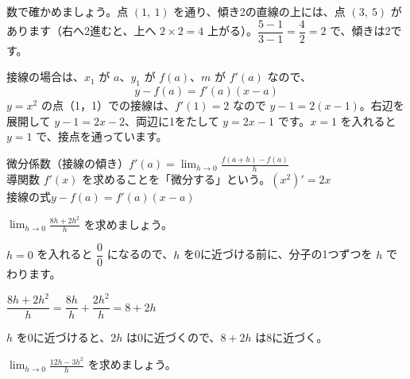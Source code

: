 \medskip
数で確かめましょう。点 $(1,\ 1)$ を通り、傾き2の直線の上には、点 $(3,\ 5)$ があります（右へ2進むと、上へ $2\times2=4$ 上がる）。$\dfrac{5-1}{3-1}=\dfrac{4}{2}=2$ で、傾きは2です。

接線の場合は、$x_1$ が $a$、$y_1$ が $f(a)$、$m$ が $f'(a)$ なので、
\[ y-f(a)=f'(a)(x-a) \]
$y=x^2$ の点（1，1）での接線は、$f'(1)=2$ なので $y-1=2(x-1)$。右辺を展開して $y-1=2x-2$、両辺に1をたして $y=2x-1$ です。$x=1$ を入れると $y=1$ で、接点を通っています。

\begin{taisetsu}
微分係数（接線の傾き）\quad $f'(a)=\displaystyle\lim_{h\to0}\frac{f(a+h)-f(a)}{h}$\\
導関数 $f'(x)$ を求めることを「微分する」という。$(x^2)'=2x$\\
接線の式\quad $y-f(a)=f'(a)(x-a)$
\end{taisetsu}

\begin{kotoba}
\small
{}
\end{kotoba}


\begin{reidai}[極限を求める]
$\displaystyle\lim_{h\to0}\frac{8h+2h^2}{h}$ を求めましょう。\par
\kangaekata $h=0$ を入れると $\dfrac{0}{0}$ になるので、$h$ を0に近づける前に、分子の1つずつを $h$ でわります。\par
\shiki $\dfrac{8h+2h^2}{h}=\dfrac{8h}{h}+\dfrac{2h^2}{h}=8+2h$\par
\hspace*{2.6\zw}$h$ を0に近づけると、$2h$ は0に近づくので、$8+2h$ は8に近づく。\par
{}
\end{reidai}

\begin{jibun}
$\displaystyle\lim_{h\to0}\frac{12h-3h^2}{h}$ を求めましょう。
\end{jibun}

